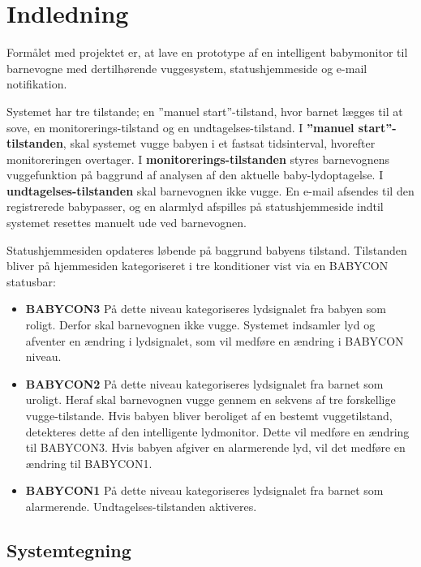 \section{Indledning}

Formålet med projektet er, at lave en prototype af en intelligent babymonitor til barnevogne med dertilhørende vuggesystem, statushjemmeside og e-mail notifikation.

Systemet har tre tilstande; en ''manuel start''-tilstand, hvor barnet lægges til at sove, en monitorerings-tilstand og en undtagelses-tilstand.
I \textbf{''manuel start''-tilstanden}, skal systemet vugge babyen i et fastsat tidsinterval, hvorefter monitoreringen overtager.
I \textbf{monitorerings-tilstanden} styres barnevognens vuggefunktion på baggrund af analysen af den aktuelle baby-lydoptagelse.
I \textbf{undtagelses-tilstanden} skal barnevognen ikke vugge. En e-mail afsendes til den registrerede babypasser, og en alarmlyd afspilles på statushjemmeside indtil systemet resettes manuelt ude ved barnevognen. 

Statushjemmesiden opdateres løbende  på baggrund babyens tilstand. Tilstanden bliver på hjemmesiden kategoriseret i tre konditioner vist via en BABYCON statusbar:
\label{kravspec:indledning_babycon_states}
\begin{itemize}
\item \textbf{BABYCON3} 
\newline På dette niveau kategoriseres lydsignalet fra babyen som roligt. Derfor skal barnevognen ikke vugge. Systemet indsamler lyd og afventer en ændring i lydsignalet, som vil medføre en ændring i BABYCON niveau. 

\item \textbf{BABYCON2}
\newline På dette niveau kategoriseres lydsignalet fra barnet som uroligt. Heraf skal barnevognen vugge gennem en sekvens af tre forskellige vugge-tilstande. Hvis babyen bliver beroliget af en bestemt vuggetilstand, detekteres dette af den intelligente lydmonitor. Dette vil medføre en ændring til BABYCON3. Hvis babyen afgiver en alarmerende lyd, vil det medføre en ændring til BABYCON1.  

\item \textbf{BABYCON1}
\newline På dette niveau kategoriseres lydsignalet fra barnet som alarmerende. Undtagelses-tilstanden aktiveres. 
\end{itemize}
 
\subsection*{Systemtegning}

